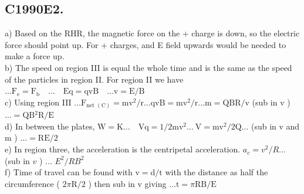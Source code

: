 \begin{enumerate}
\section*{C1990E2.}
a) Based on the RHR, the magnetic force on the + charge is down, so the electric force should point up. For + charges, and E field upwards would be needed to make a force up.\\
b) The speed on region III is equal the whole time and is the same as the speed of the particles in region II. For region II we have $\ldots \mathrm{F}_{\mathrm{e}}=\mathrm{F}_{\mathrm{b}} \quad \ldots \quad \mathrm{Eq}=\mathrm{qvB} \quad \ldots \mathrm{v}=\mathrm{E} / \mathrm{B}$\\
c) Using region III $\ldots \mathrm{F}_{\text {net }(\mathrm{C})}=\mathrm{mv}^{2} / \mathrm{r} \ldots \mathrm{qvB}=\mathrm{mv}^{2} / \mathrm{r} \ldots \mathrm{m}=\mathrm{QBR} / \mathrm{v}$ (sub in v ) $\ldots=\mathrm{QB}{ }^{2} \mathrm{R} / \mathrm{E}$\\
d) In between the plates, $\mathrm{W}=\mathrm{K} \ldots \quad \mathrm{Vq}=1 / 2 \mathrm{mv}^{2} \ldots \mathrm{~V}=\mathrm{mv}^{2} / 2 \mathrm{Q} \ldots$ (sub in v and m ) $\ldots=\mathrm{RE} / 2$\\
e) In region three, the acceleration is the centripetal acceleration. $a_{c}=v^{2} / R \ldots$ (sub in $v$ ) ... $E^{2} / R B^{2}$\\
f) Time of travel can be found with $\mathrm{v}=\mathrm{d} / \mathrm{t}$ with the distance as half the circumference ( $2 \pi \mathrm{R} / 2$ ) then sub in v giving $\ldots \mathrm{t}=\pi \mathrm{RB} / \mathrm{E}$


\end{enumerate}
